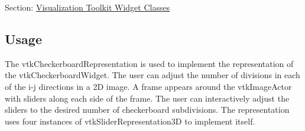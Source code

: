 Section\-: \hyperlink{sec_vtkwidgets}{Visualization Toolkit Widget Classes} \hypertarget{vtkwidgets_vtkxyplotwidget_Usage}{}\subsection{Usage}\label{vtkwidgets_vtkxyplotwidget_Usage}
The vtk\-Checkerboard\-Representation is used to implement the representation of the vtk\-Checkerboard\-Widget. The user can adjust the number of divisions in each of the i-\/j directions in a 2\-D image. A frame appears around the vtk\-Image\-Actor with sliders along each side of the frame. The user can interactively adjust the sliders to the desired number of checkerboard subdivisions. The representation uses four instances of vtk\-Slider\-Representation3\-D to implement itself.

